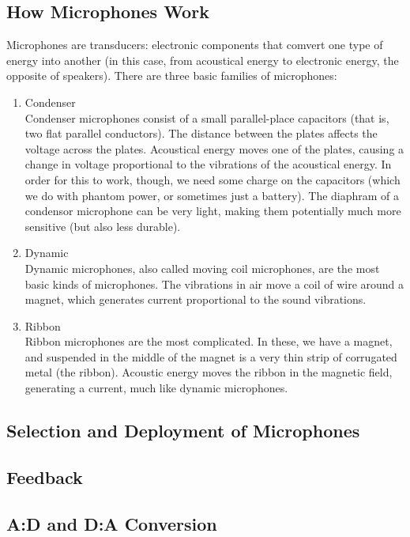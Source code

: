 \documentclass[a4paper]{article}
\begin{document}
\subsection{How Microphones Work}
Microphones are transducers: electronic components that comvert one type of
energy into another (in this case, from acoustical energy to electronic energy,
the opposite of speakers). There are three basic families of microphones:
\begin{enumerate}
	\item Condenser\\
		Condenser microphones consist of a small parallel-place
		capacitors (that is, two flat parallel conductors). The
		distance between the plates affects the voltage across the
		plates. Acoustical energy moves one of the plates, causing a
		change in voltage proportional to the vibrations of the
		acoustical energy. In order for this to work, though, we need
		some charge on the capacitors (which we do with phantom power,
		or sometimes just a battery). The diaphram of a condensor
		microphone can be very light, making them potentially much more
		sensitive (but also less durable).
	\item Dynamic\\
		Dynamic microphones, also called moving coil microphones,
		are the most basic kinds of microphones. The vibrations in air
		move a coil of wire around a magnet, which generates current
		proportional to the sound vibrations.
	\item Ribbon\\
		Ribbon microphones are the most complicated. In these, we have
		a magnet, and suspended in the middle of the magnet is a very
		thin strip of corrugated metal (the ribbon). Acoustic energy
		moves the ribbon in the magnetic field, generating a current,
		much like dynamic microphones.

\end{enumerate}

\subsection{Selection and Deployment of Microphones}

\subsection{Feedback}

\subsection{A:D and D:A Conversion}
\end{document}

